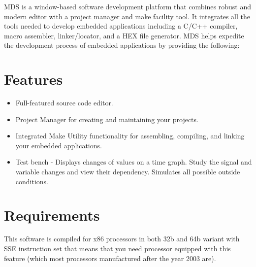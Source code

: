 MDS is a window-based software development platform that combines robust and modern editor with a project manager and make facility tool. It integrates all the tools needed to develop embedded applications including a C/C++ compiler, macro assembler, linker/locator, and a HEX file generator. MDS helps expedite the development process of embedded applications by providing the following:

\section{Features}
    \begin{itemize}
        \item Full-featured source code editor.
        \item Project Manager for creating and maintaining your projects.
        \item Integrated Make Utility functionality for assembling, compiling, and linking your embedded applications.
        \item Test bench - Displays changes of values on a time graph. Study the signal and variable changes and view their dependency. Simulates all possible outside conditions.
    \end{itemize}

\section{Requirements}
    This software is compiled for x86 processors in both 32b and 64b variant with SSE instruction set that means that you need processor equipped with this feature (which most processors manufactured after the year 2003 are).